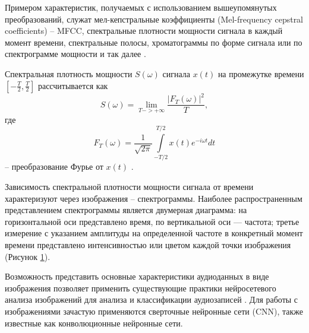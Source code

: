 Примером характеристик, получаемых с использованием вышеупомянутых преобразований, служат мел-кепстральные коэффициенты (Mel-frequency cepstral coefficients) -- MFCC,
спектральные плотности мощности сигнала в каждый момент времени, 
спектральные полосы, хроматограммы по форме сигнала или по спектрограмме мощности и так далее \cite{mus_zhao}.

Спектральная плотность мощности $S(\omega)$ сигнала $x(t)$ на промежутке времени $\left[-\frac{T}{2},\frac{T}{2}\right]$ рассчитывается как
\begin{equation}
	S(\omega) = \lim_{T->+\infty} \frac{\left|F_T(\omega)\right|^2}{T},
\end{equation}
где
\begin{equation}
	F_{T}(\omega )={\frac {1}{\sqrt {2\pi }}}\int \limits _{-T/2}^{T/2}x(t)e^{-i\omega t} dt
\end{equation}
-- преобразование Фурье	от $x(t)$ \cite{otnes}.

Зависимость спектральной плотности мощности сигнала от времени характеризуют через изображения -- спектрограммы.
Наиболее распространенным представлением спектрограммы является двумерная диаграмма: на горизонтальной оси представлено время, 
по вертикальной оси — частота; третье измерение с указанием амплитуды на определенной частоте в конкретный момент времени представлено 
интенсивностью или цветом каждой точки изображения (Рисунок \ref{fig:spec}).

\begin{figure}[H]
	\caption{}
	\label{fig:spec}
\end{figure}

Возможность представить основные характеристики аудиоданных в виде изображения позволяет применить существующие практики
нейросетевого анализа изображений для анализа и классификации аудиозаписей \cite{cyber_alex}.
Для работы с изображениями зачастую применяются сверточные нейронные сети (CNN), также известные как конволюционные нейронные сети.

